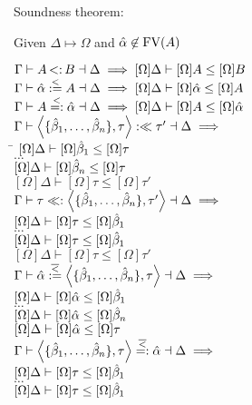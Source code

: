\documentclass{article}
\begin{document}
Soundness theorem:

Given $\Delta \mapsto \Omega$ and $\hat{\alpha}\not\in\text{FV}(A)$
\begin{tabbing}
$\Gamma \vdash A \st B \dashv \Delta \implies [\Omega]\Delta \vdash [\Omega]A \leq [\Omega]B$\\
$\Gamma \vdash \hat{\alpha} \overset{<}{:=} A \dashv \Delta \implies [\Omega]\Delta \vdash [\Omega]\hat{\alpha} \leq [\Omega]A$\\
$\Gamma \vdash  A \overset{<}{=:} \hat{\alpha} \dashv \Delta \implies [\Omega]\Delta \vdash [\Omega]A \leq [\Omega]\hat{\alpha}$\\
$\Gamma \vdash \left<\{\hat{\beta}_1,\ldots,\hat{\beta}_n\},\tau\right> :\ll \tau' \dashv \Delta \implies$\\
\hspace{1em}\= $[\Omega]\Delta \vdash [\Omega]\hat{\beta}_1 \leq [\Omega]\tau$\\
\> $\ldots$\\
\> $[\Omega]\Delta \vdash [\Omega]\hat{\beta}_n \leq [\Omega]\tau$\\
\> $[\Omega]\Delta \vdash [\Omega]\tau \leq [\Omega]\tau'$\\
$\Gamma \vdash \tau \ll: \left<\{\hat{\beta}_1,\ldots,\hat{\beta}_n\},\tau'\right> \dashv \Delta \implies$\\
\> $[\Omega]\Delta \vdash [\Omega]\tau \leq [\Omega]\hat{\beta}_1$\\
\> $\ldots$\\
\> $[\Omega]\Delta \vdash [\Omega]\tau \leq [\Omega]\hat{\beta}_1$\\
\> $[\Omega]\Delta \vdash [\Omega]\tau \leq [\Omega]\tau'$\\
$\Gamma \vdash \hat{\alpha} \overset{\overline{<}}{:=} \left<\{\hat{\beta}_1,\ldots,\hat{\beta}_n\},\tau\right> \dashv \Delta \implies$\\
\> $[\Omega]\Delta \vdash [\Omega]\hat{\alpha} \leq [\Omega]\hat{\beta}_1$\\
\> $\ldots$\\
\> $[\Omega]\Delta \vdash [\Omega]\hat{\alpha} \leq [\Omega]\hat{\beta}_n$\\
\> $[\Omega]\Delta \vdash [\Omega]\hat{\alpha} \leq [\Omega]\tau$\\
$\Gamma \vdash \left<\{\hat{\beta}_1,\ldots,\hat{\beta}_n\},\tau\right> \overset{\overline{<}}{=:} \hat{\alpha} \dashv \Delta \implies$\\
\> $[\Omega]\Delta \vdash [\Omega]\tau \leq [\Omega]\hat{\beta}_1$\\
\> $\ldots$\\
\> $[\Omega]\Delta \vdash [\Omega]\tau \leq [\Omega]\hat{\beta}_1$\\

\end{tabbing}
\end{document}
